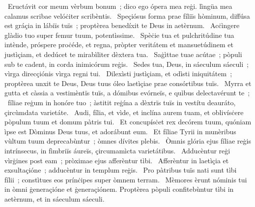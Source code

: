 \psalmChapterWithInscription{}
{ }
{%
~Eructávit cor meum vèrbum bonum~; dico ego ópera mea reġi. lìngüa mea calamus scribae velóċiter scribèntis. 
~Speçiósus forma prae fíliïs hòminum, diffúsa est gráçia in lábiïs tuïs~; proptèrea benedíxit te Deus in aetèrnum. 
~Acċìngere glàdio tuo super femur tuum, potentìssime. 
~Spèċie tua et pulchritúdine tua intènde, próspere proċéde, et regna, pròpter veritátem et mansuetúdinem et justìçiam, et dedúcet te mirabìliter dèxtera tua. 
~Saġìttae tuae acútae~; pòpuli sub te cadent, in corda inimicórum reġis. 
~Sedes tua, Deus, in sáeculum sáeculi~; vìrga direcçiónis vìrga regni tui. 
~Dilexìsti justìçiam, et odìsti iniquitátem~; proptèrea unxit te Deus, Deus tuus óleo laetìçiae prae consórtibus tuïs. 
~Myrra et gutta et càssia a vestimèntïs tuïs, a dómibus evórneïs, e quìbus delectavérunt te~; 
~fíliae reġum in honóre tuo~; àstitit reġína a dèxtrïs tuïs in vestítu deauráto, çircùmdata varietáte. 
~Audi, fília, et vìde, et inclína aurem tuam, et oblivísċere pòpulum tuum et domum pàtris tui. 
~Et concupísċet rex decórem tuum, quóniam ìpse est Dòminus Deus tuus, et adorábunt eum. 
~Et fíliae Tyrii in munèribus vùltum tuum deprecabùntur~; òmnes dívites plebis. 
~Òmnis glória ejus fíliae reġis intrínsecus, in fìmbriïs áureïs, çircumamìcta varietátibus. 
~Adducèntur reġi vìrġines post eam~; pròximae ejus afferèntur tìbi. 
~Afferèntur in laetìçia et exsultaçióne~; adducèntur in templum reġis. 
~Pro pàtribus tuïs nati sunt tìbi fílii~; constìtues eos prínċipes super òmnem terram. 
~Mèmores èrunt nóminis tui in òmni ġeneraçióne et ġeneraçiónem. Proptèrea pòpuli confitebùntur tìbi in aetèrnum, et in sáeculum sáeculi. 
}
